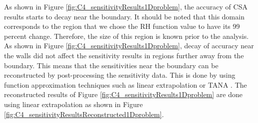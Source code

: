 As shown in Figure \ref{fig:C4_sensitivityResults1Dproblem}, the accuracy of CSA results starts to decay near the boundary. It should be noted that this domain corresponds to the region that we chose the RH function value to have its 99 percent change. Therefore, the size of this region is known prior to the analysis. As shown in Figure \ref{fig:C4_sensitivityResults1Dproblem}, decay of accuracy near the walls did not affect the sensitivity results in regions further away from the boundary. This means that the sensitivities near the boundary can be reconstructed by post-processing the sensitivity data. This is done by using function approximation techniques such as linear extrapolation or TANA \cite{wang1995improved}. The reconstructed results of Figure \ref{fig:C4_sensitivityResults1Dproblem} are done using linear extrapolation as shown in Figure \ref{fig:C4_sensitivityResultsReconstructed1Dproblem}.

